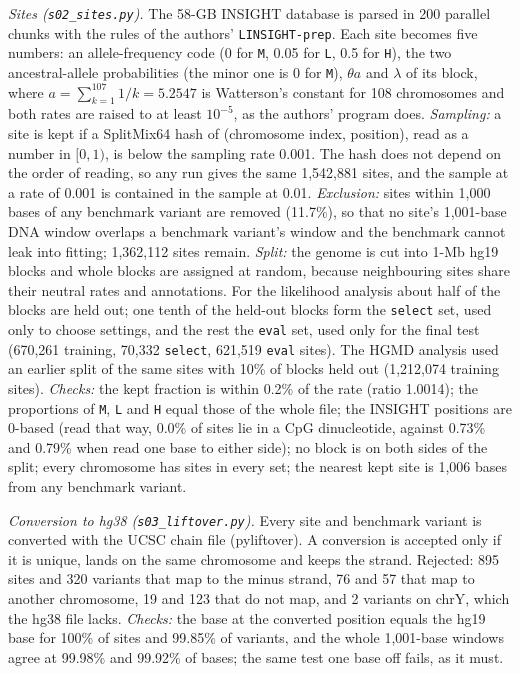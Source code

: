 \documentclass[11pt]{article}
\newcommand{\file}[1]{\nolinkurl{#1}}
\begin{document}
\emph{Sites (\file{s02_sites.py}).} The 58-GB INSIGHT database is parsed in 200 parallel chunks with the
rules of the authors' \file{LINSIGHT-prep}. Each site becomes five numbers: an allele-frequency code (0 for
\texttt{M}, 0.05 for \texttt{L}, 0.5 for \texttt{H}), the two ancestral-allele probabilities (the minor one
is 0 for \texttt{M}), $\theta a$ and $\lambda$ of its block, where $a=\sum_{k=1}^{107}1/k=5.2547$ is
Watterson's constant for 108 chromosomes and both rates are raised to at least $10^{-5}$, as the authors'
program does. \emph{Sampling:} a site is kept if a SplitMix64 hash of (chromosome index, position), read as
a number in $[0,1)$, is below the sampling rate 0.001. The hash does not depend on the order of reading, so
any run gives the same 1,542,881 sites, and the sample at a rate of 0.001 is contained in the sample at
0.01. \emph{Exclusion:} sites within 1,000 bases of any benchmark variant are removed (11.7\%), so that no
site's 1,001-base DNA window overlaps a benchmark variant's window and the benchmark cannot leak into
fitting; 1,362,112 sites remain. \emph{Split:} the genome is cut into 1-Mb hg19 blocks and whole blocks are
assigned at random, because neighbouring sites share their neutral rates and annotations. For the
likelihood analysis about half of the blocks are held out; one tenth of the held-out blocks form the
\texttt{select} set, used only to choose settings, and the rest the \texttt{eval} set, used only for the
final test (670,261 training, 70,332 \texttt{select}, 621,519 \texttt{eval} sites). The HGMD analysis used
an earlier split of the same sites with 10\% of blocks held out (1,212,074 training sites).
\emph{Checks:} the kept fraction is within 0.2\% of the rate (ratio 1.0014); the proportions of
\texttt{M}, \texttt{L} and \texttt{H} equal those of the whole file; the INSIGHT positions are 0-based (read
that way, 0.0\% of sites lie in a CpG dinucleotide, against 0.73\% and 0.79\% when read one base to either
side); no block is on both
sides of the split; every chromosome has sites in every set; the nearest kept site is 1,006 bases from any
benchmark variant.

\emph{Conversion to hg38 (\file{s03_liftover.py}).} Every site and benchmark variant is converted with the
UCSC chain file (pyliftover). A conversion is accepted only if it is unique, lands on the same chromosome and
keeps the strand. Rejected: 895 sites and 320 variants that map to the minus strand, 76 and 57 that map to
another chromosome, 19 and 123 that do not map, and 2 variants on chrY, which the hg38 file lacks.
\emph{Checks:} the base at the converted position equals the hg19 base for 100\% of sites and 99.85\% of
variants, and the whole 1,001-base windows agree at 99.98\% and 99.92\% of bases; the same test one base
off fails, as it must.
\end{document}
